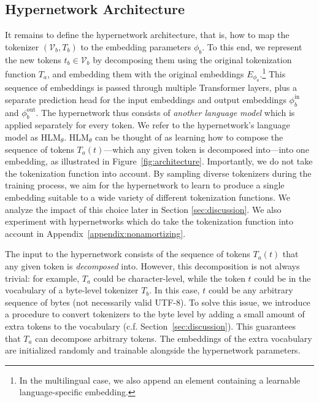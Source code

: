 \documentclass{article}
\begin{document}
\subsection{Hypernetwork Architecture}
\label{subsec:architecture}

It remains to define the hypernetwork architecture, that is, how to map the tokenizer $(\mathcal{V}_b, T_b)$ to the embedding parameters $\phi_b$. To this end, we represent the new tokens $t_b \in \mathcal{V}_b$ by decomposing them using the original tokenization function $T_a$, and embedding them with the original embeddings $E_{\phi_a}$.\footnote{In the multilingual case, we also append an element containing a learnable language-specific embedding.} This sequence of embeddings is passed through multiple Transformer layers, plus a separate prediction head for the input embeddings and output embeddings $\phi^{\text{in}}_b$ and $\phi^{\text{out}}_b$. The hypernetwork thus consists of \textit{another language model} which is applied separately for every token. We refer to the hypernetwork's language model as $\mathrm{HLM}_\theta$. $\mathrm{HLM}_\theta$ can be thought of as learning how to compose the sequence of tokens $T_a(t)$---which any given token is decomposed into---into one embedding, as illustrated in Figure~\ref{fig:architecture}. Importantly, we do not take the tokenization function into account. By sampling diverse tokenizers
during the training process, we aim for the hypernetwork to learn to produce a single embedding suitable to a wide variety of different tokenization functions. We analyze the impact of this choice later in Section \ref{sec:discussion}. We also experiment with hypernetworks which do take the tokenization function into account in Appendix~\ref{appendix:nonamortizing}.

 The input to the hypernetwork consists of the sequence of tokens $T_a(t)$ that any given token is \textit{decomposed} into. However, this decomposition is not always trivial: for example, $T_a$ could be character-level, while the token $t$ could be in the vocabulary of a byte-level tokenizer $T_b$. In this case, $t$ could be any arbitrary sequence of bytes (not necessarily valid UTF-8). To solve this issue, we introduce a procedure to convert tokenizers to the byte level by adding a small amount of extra tokens to the vocabulary (c.f. Section~\ref{sec:discussion}). This guarantees that $T_a$ can decompose arbitrary tokens. The embeddings of the extra vocabulary are initialized randomly and trainable alongside the hypernetwork parameters.
\end{document}
